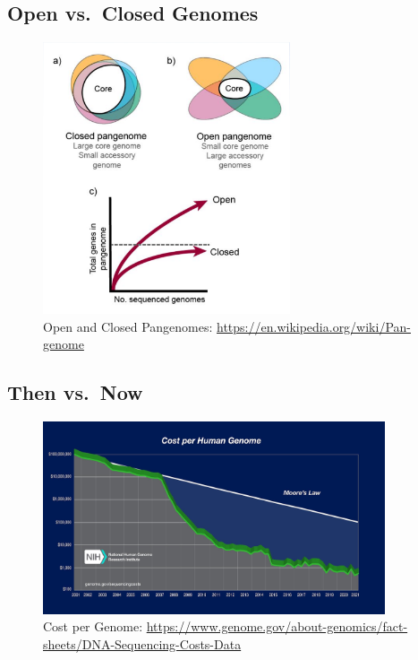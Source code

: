 \documentclass[
]{book}
\begin{document}
\hypertarget{open-vs.-closed-genomes}{%
\subsection{Open vs.~Closed Genomes}\label{open-vs.-closed-genomes}}

\begin{figure}
\centering
\includegraphics[width=0.65\textwidth,height=\textheight]{./Figures/ClosedvOpen.png}
\caption{Open and Closed Pangenomes: \url{https://en.wikipedia.org/wiki/Pan-genome}}
\end{figure}

\hypertarget{then-vs.-now}{%
\subsection{Then vs.~Now}\label{then-vs.-now}}

\begin{figure}
\centering
\includegraphics[width=0.9\textwidth,height=\textheight]{./Figures/CostGenome.png}
\caption{Cost per Genome: \url{https://www.genome.gov/about-genomics/fact-sheets/DNA-Sequencing-Costs-Data}}
\end{figure}
\end{document}
